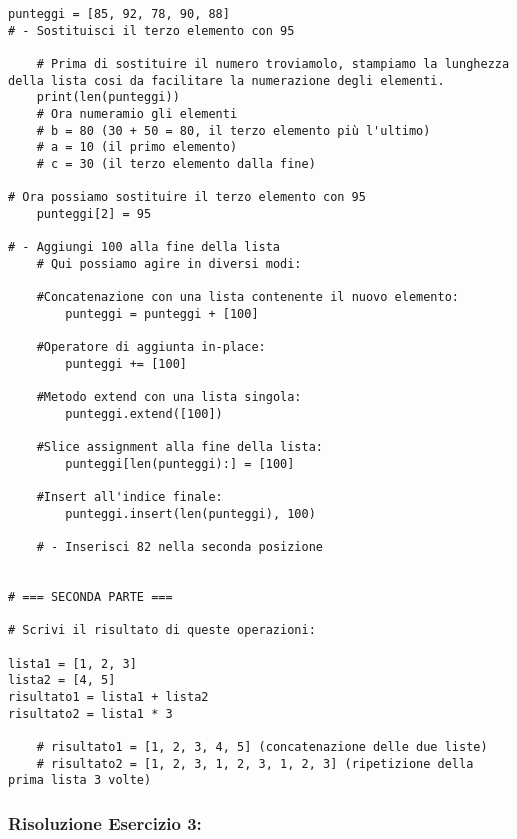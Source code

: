 \begin{lstlisting}
punteggi = [85, 92, 78, 90, 88]
# - Sostituisci il terzo elemento con 95

    # Prima di sostituire il numero troviamolo, stampiamo la lunghezza della lista cosi da facilitare la numerazione degli elementi.
    print(len(punteggi))
    # Ora numeramio gli elementi
    # b = 80 (30 + 50 = 80, il terzo elemento più l'ultimo)
    # a = 10 (il primo elemento)
    # c = 30 (il terzo elemento dalla fine)

# Ora possiamo sostituire il terzo elemento con 95
    punteggi[2] = 95
    
# - Aggiungi 100 alla fine della lista
    # Qui possiamo agire in diversi modi: 
    
    #Concatenazione con una lista contenente il nuovo elemento:
        punteggi = punteggi + [100]
    
    #Operatore di aggiunta in-place:
        punteggi += [100]
    
    #Metodo extend con una lista singola:
        punteggi.extend([100])
    
    #Slice assignment alla fine della lista:
        punteggi[len(punteggi):] = [100]
    
    #Insert all'indice finale:
        punteggi.insert(len(punteggi), 100)
    
    # - Inserisci 82 nella seconda posizione


# === SECONDA PARTE ===

# Scrivi il risultato di queste operazioni:

lista1 = [1, 2, 3]
lista2 = [4, 5]
risultato1 = lista1 + lista2
risultato2 = lista1 * 3

    # risultato1 = [1, 2, 3, 4, 5] (concatenazione delle due liste)
    # risultato2 = [1, 2, 3, 1, 2, 3, 1, 2, 3] (ripetizione della prima lista 3 volte)
\end{lstlisting}


\subsubsection{Risoluzione Esercizio 3: }

